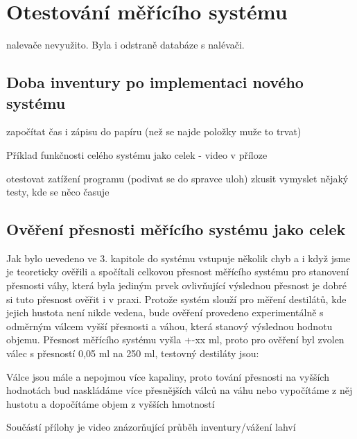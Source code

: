 
\chapter{Otestování měřícího systému}
nalevače
nevyužito. Byla i odstraně databáze s nalévači.


\section{Doba inventury po implementaci nového systému}

započítat čas i zápisu do papíru (než se najde položky muže to trvat)

Příklad funkčnosti celého systému jako celek - video v příloze

otestovat zatížení programu (podivat se do spravce uloh)
zkusit vymyslet nějaký testy, kde se něco časuje

\section{Ověření přesnosti měřícího systému jako celek}

Jak bylo uevedeno ve 3. kapitole do systému vstupuje několik chyb a i když jsme je teoreticky ověřili a spočítali celkovou přesnost měřícího systému pro stanovení přesnosti váhy, která byla jediným prvek ovlivňující výslednou přesnost je dobré si tuto přesnost ověřit i v praxi. Protože systém slouží pro měření destilátů, kde jejich hustota není nikde vedena, bude ověření provedeno experimentálně s odměrným válcem vyšší přesnosti a váhou, která stanový výslednou hodnotu objemu. Přesnost měřícího systému vyšla +-xx ml, proto pro ověření byl zvolen válec s přesností 0,05 ml na 250 ml, testovný destiláty jsou:

Válce jsou mále a nepojmou více kapaliny, proto tování přesnosti na vyšších hodnotách bud naskládáme více přesnějších válců na váhu nebo vypočítáme z něj hustotu a dopočítáme objem z vyšších hmotností

Součástí přílohy je video znázorňující průběh inventury/vážení lahví
